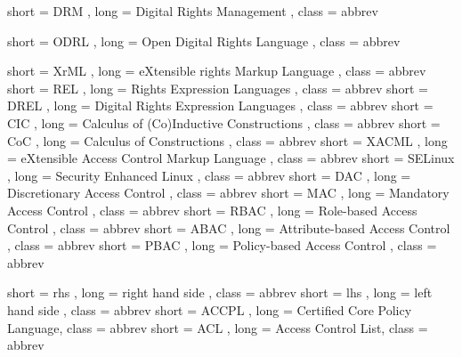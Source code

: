 {
  short = DRM ,
  long  = Digital Rights Management ,
  class = abbrev
}

{
  short = ODRL ,
  long  = Open Digital Rights Language ,
  class = abbrev
}

{
  short = XrML ,
  long  = eXtensible rights Markup Language ,
  class = abbrev
}
{
  short = REL ,
  long  = Rights Expression Languages ,
  class = abbrev
}
{
  short = DREL ,
  long  = Digital Rights Expression Languages ,
  class = abbrev
}
{
  short = CIC ,
  long  = Calculus of (Co)Inductive Constructions ,
  class = abbrev
}
{
  short = CoC ,
  long  = Calculus of Constructions ,
  class = abbrev
}
{
  short = XACML ,
  long  = eXtensible Access Control Markup Language ,
  class = abbrev
}
{
  short = SELinux ,
  long  = Security Enhanced Linux ,
  class = abbrev
}
{
  short = DAC ,
  long  = Discretionary Access Control ,
  class = abbrev
}
{
  short = MAC ,
  long  = Mandatory Access Control ,
  class = abbrev
}
{
  short = RBAC ,
  long  = Role-based Access Control ,
  class = abbrev
}
{
  short = ABAC ,
  long  = Attribute-based Access Control ,
  class = abbrev
}
{
  short = PBAC ,
  long  = Policy-based Access Control ,
  class = abbrev
}

{
  short = rhs ,
  long  = right hand side ,
  class = abbrev
}
{
  short = lhs ,
  long  = left hand side ,
  class = abbrev
}
{
  short = ACCPL ,
  long  =  Certified Core Policy Language,
  class = abbrev
}
{
  short = ACL ,
  long  =  Access Control List,
  class = abbrev
}


